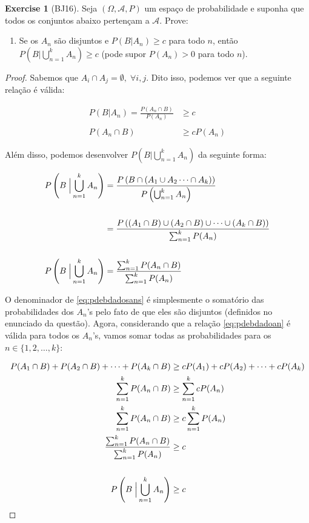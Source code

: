 \documentclass[
]{article}
\providecommand{\tightlist}{%
  \setlength{\itemsep}{0pt}\setlength{\parskip}{0pt}}
\theoremstyle{definition}
\theoremstyle{definition}
\theoremstyle{definition}
\newtheorem{exercise}{Exercise}[section]
\theoremstyle{definition}
\theoremstyle{remark}
\begin{document}
\begin{exercise}[BJ16]

Seja \((\Omega, \mathcal{A},P)\) um espaço de probabilidade e suponha que todos os conjuntos abaixo pertençam a \(\mathcal{A}\). Prove:

\begin{enumerate}
\def\labelenumi{\alph{enumi})}
\tightlist
\item
  Se os \(A_{n}\) são disjuntos e \(P(B|A_{n}) \ge c\) para todo \(n\), então \(P(B|\bigcup_{n=1}^{k}A_{n}) \ge c\) (pode supor \(P(A_{n}) > 0\) para todo \(n\)).
\end{enumerate}

\begin{proof}
Sabemos que \(A_{i} \cap A_{j} = \emptyset, \; \forall i,j\). Dito isso, podemos ver que a seguinte relação é válida:

\begin{align}
P(B|A_{n}) = \frac{P(A_{n} \cap B)}{P(A_{n})} &\ge c \nonumber \\ \nonumber \\
P(A_{n} \cap B) &\ge cP(A_{n})
\label{eq:pdebdadoan}
\end{align}

Além disso, podemos desenvolver \(P(B|\bigcup_{n=1}^{k}A_{n})\) da seguinte forma:

\begin{align}
P\left(B \; \Big{|} \bigcup_{n=1}^{k}A_{n}\right) &= \frac{P\left(B \cap (A_{1} \cup A_{2} \dots \cap A_{k})\right)}{P\left(\bigcup_{n=1}^{k}A_{n}\right)} \nonumber \\ \nonumber \\
&= \frac{P\left((A_{1} \cap B) \cup (A_{2} \cap B) \cup \dots \cup (A_{k} \cap B)\right)}{\sum_{n = 1}^{k}P(A_{n})} \nonumber \\ \nonumber \\
P\left(B \; \Big{|} \bigcup_{n=1}^{k}A_{n}\right) &= \frac{\sum_{n=1}^{k}P(A_{n} \cap B)}{\sum_{n = 1}^{k}P(A_{n})}
\label{eq:pdebdadosans}
\end{align}

O denominador de \eqref{eq:pdebdadosans} é simplesmente o somatório das probabilidades dos \(A_{n}\)'s pelo fato de que eles são disjuntos (definidos no enunciado da questão). Agora, considerando que a relação \eqref{eq:pdebdadoan} é válida para todos os \(A_{n}\)'s, vamos somar todas as probabilidades para os \(n \in \{1,2,\dots,k\}\):

\begin{align*}
P(A_{1} \cap B) + P(A_{2} \cap B) + \dots + P(A_{k} \cap B) &\ge cP(A_{1}) + cP(A_{2}) + \dots + cP(A_{k}) \\
\sum_{n=1}^{k}P(A_{n} \cap B) &\ge \sum_{n=1}^{k}cP(A_{n}) \\
\sum_{n=1}^{k}P(A_{n} \cap B) &\ge c\sum_{n=1}^{k}P(A_{n}) \\
\frac{\sum_{n=1}^{k}P(A_{n} \cap B)}{\sum_{n=1}^{k}P(A_{n})} &\ge c \\ \\
P\left(B \; \Big{|} \bigcup_{n=1}^{k}A_{n}\right) &\ge c
\end{align*}
\end{proof}


\end{exercise}
\end{document}
